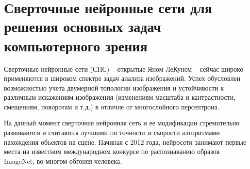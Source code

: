 \section{Сверточные нейронные сети для решения основных задач компьютерного зрения}

Сверточные нейронные сети (СНС) -- открытые Яном ЛеКуном -- сейчас широко применяются в широком спектре задач анализа изображений. Успех обусловлен возможностью учета двумерной топологии изображения и устойчивости к различным искажениям изображения (изменениям масштаба и кантрастности, смещениям, поворотам и т.д.) в отличие от многослойного персептрона.

На данный момент сверточная нейронная сеть и ее модификации стремительно развиваются и считаются лучшими по точности и скорости алгоритмами нахождения объектов на сцене. Начиная с 2012 года, нейросети занимают первые места на известном международном конкурсе по распознаванию образов ImageNet, во многом обгоняя человека.



\clearpage